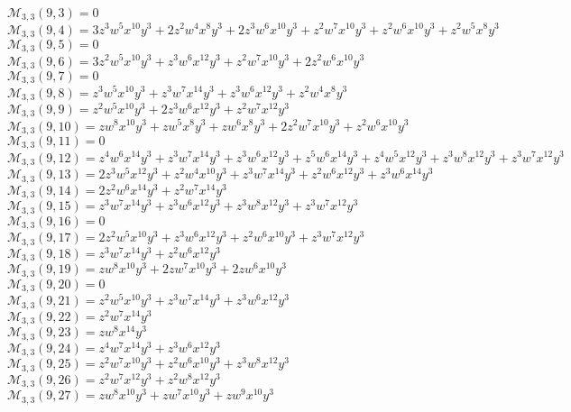 $\mathcal{M}_{3,3}(9,3)=0$\\
$\mathcal{M}_{3,3}(9,4)=3z^3w^5x^{10}y^3+2z^2w^4x^8y^3+2z^3w^6x^{10}y^3+z^2w^7x^{10}y^3+z^2w^6x^{10}y^3+z^2w^5x^8y^3$\\
$\mathcal{M}_{3,3}(9,5)=0$\\
$\mathcal{M}_{3,3}(9,6)=3z^2w^5x^{10}y^3+z^3w^6x^{12}y^3+z^2w^7x^{10}y^3+2z^2w^6x^{10}y^3$\\
$\mathcal{M}_{3,3}(9,7)=0$\\
$\mathcal{M}_{3,3}(9,8)=z^3w^5x^{10}y^3+z^3w^7x^{14}y^3+z^3w^6x^{12}y^3+z^2w^4x^8y^3$\\
$\mathcal{M}_{3,3}(9,9)=z^2w^5x^{10}y^3+2z^3w^6x^{12}y^3+z^2w^7x^{12}y^3$\\
$\mathcal{M}_{3,3}(9,10)=zw^8x^{10}y^3+zw^5x^8y^3+zw^6x^8y^3+2z^2w^7x^{10}y^3+z^2w^6x^{10}y^3$\\
$\mathcal{M}_{3,3}(9,11)=0$\\
$\mathcal{M}_{3,3}(9,12)=z^4w^6x^{14}y^3+z^3w^7x^{14}y^3+z^3w^6x^{12}y^3+z^5w^6x^{14}y^3+z^4w^5x^{12}y^3+z^3w^8x^{12}y^3+z^3w^7x^{12}y^3$\\
$\mathcal{M}_{3,3}(9,13)=2z^3w^5x^{12}y^3+z^2w^4x^{10}y^3+z^3w^7x^{14}y^3+z^2w^6x^{12}y^3+z^3w^6x^{14}y^3$\\
$\mathcal{M}_{3,3}(9,14)=2z^2w^6x^{14}y^3+z^2w^7x^{14}y^3$\\
$\mathcal{M}_{3,3}(9,15)=z^3w^7x^{14}y^3+z^3w^6x^{12}y^3+z^3w^8x^{12}y^3+z^3w^7x^{12}y^3$\\
$\mathcal{M}_{3,3}(9,16)=0$\\
$\mathcal{M}_{3,3}(9,17)=2z^2w^5x^{10}y^3+z^3w^6x^{12}y^3+z^2w^6x^{10}y^3+z^3w^7x^{12}y^3$\\
$\mathcal{M}_{3,3}(9,18)=z^3w^7x^{14}y^3+z^2w^6x^{12}y^3$\\
$\mathcal{M}_{3,3}(9,19)=zw^8x^{10}y^3+2zw^7x^{10}y^3+2zw^6x^{10}y^3$\\
$\mathcal{M}_{3,3}(9,20)=0$\\
$\mathcal{M}_{3,3}(9,21)=z^2w^5x^{10}y^3+z^3w^7x^{14}y^3+z^3w^6x^{12}y^3$\\
$\mathcal{M}_{3,3}(9,22)=z^2w^7x^{14}y^3$\\
$\mathcal{M}_{3,3}(9,23)=zw^8x^{14}y^3$\\
$\mathcal{M}_{3,3}(9,24)=z^4w^7x^{14}y^3+z^3w^6x^{12}y^3$\\
$\mathcal{M}_{3,3}(9,25)=z^2w^7x^{10}y^3+z^2w^6x^{10}y^3+z^3w^8x^{12}y^3$\\
$\mathcal{M}_{3,3}(9,26)=z^2w^7x^{12}y^3+z^2w^8x^{12}y^3$\\
$\mathcal{M}_{3,3}(9,27)=zw^8x^{10}y^3+zw^7x^{10}y^3+zw^9x^{10}y^3$\\
